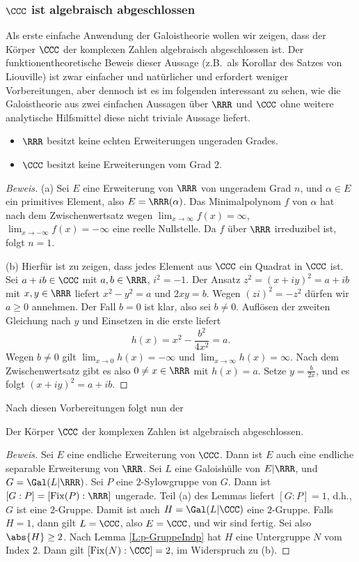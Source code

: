 \documentclass[12pt,a4paper,twoside]{article}
\DeclareMathOperator{\Fix}{Fix}
\begin{document}
\subsubsection{$\CCC$ ist algebraisch abgeschlossen}
Als erste einfache Anwendung der Galoistheorie wollen wir zeigen, dass der
K\"orper $\CCC$ der komplexen Zahlen algebraisch abgeschlossen ist. Der
funktionentheoretische Beweis dieser Aussage (z.B.\ als Korollar des Satzes
von Liouville) ist zwar einfacher und nat\"urlicher und erfordert weniger
Vorbereitungen, aber dennoch ist es im folgenden interessant zu sehen, wie die
Galoistheorie aus zwei einfachen Aussagen \"uber $\RRR$ und $\CCC$ ohne
weitere analytische Hilfsmittel diese nicht triviale Aussage liefert.
\begin{Lemma}\begin{itemize}
  \item[(a)] $\RRR$ besitzt keine echten Erweiterungen ungeraden Grades.
  \item[(b)] $\CCC$ besitzt keine Erweiterungen vom Grad $2$.
\end{itemize}
\end{Lemma}
\begin{proof}[Beweis]
  (a) Sei $E$ eine Erweiterung von $\RRR$ von ungeradem Grad $n$, und
  $\alpha\in E$ ein primitives Element, also $E=\RRR(\alpha)$. Das
  Minimalpolynom $f$ von $\alpha$ hat nach dem Zwischenwertsatz wegen
  $\lim_{x\to\infty}f(x)=\infty$, $\lim_{x\to-\infty}f(x)=-\infty$ eine reelle
  Nullstelle. Da $f$ \"uber $\RRR$ irreduzibel ist, folgt $n=1$.
  
  (b) Hierf\"ur ist zu zeigen, dass jedes Element aus $\CCC$ ein Quadrat in
  $\CCC$ ist. Sei $a+ib\in\CCC$ mit $a,b\in\RRR$, $i^2=-1$. Der Ansatz
  $z^2=(x+iy)^2=a+ib$ mit $x,y\in\RRR$ liefert $x^2-y^2=a$ und $2xy=b$. Wegen
  $(zi)^2=-z^2$ d\"urfen wir $a\ge0$ annehmen. Der Fall $b=0$ ist klar, also
  sei $b\ne0$. Aufl\"osen der zweiten Gleichung nach $y$ und Einsetzen in die
  erste liefert
\[
h(x)=x^2-\frac{b^2}{4x^2}=a.
\]
Wegen $b\ne0$ gilt $\lim_{x\to0}h(x)=-\infty$ und
$\lim_{x\to\infty}h(x)=\infty$. Nach dem Zwischenwertsatz gibt es also $0\ne
x\in\RRR$ mit $h(x)=a$. Setze $y=\frac{b}{2x}$, und es folgt $(x+iy)^2=a+ib$.
\end{proof}
Nach diesen Vorbereitungen folgt nun der
\begin{Satz}
  Der K\"orper $\CCC$ der komplexen Zahlen ist algebraisch abgeschlossen.
\end{Satz}
\begin{proof}[Beweis]
  Sei $E$ eine endliche Erweiterung von $\CCC$. Dann ist $E$ auch eine
  endliche separable Erweiterung von $\RRR$. Sei $L$ eine Galoish\"ulle von
  $E|\RRR$, und $G=\Gal(L|\RRR)$. Sei $P$ eine $2$-Sylowgruppe von $G$. Dann
  ist $[G:P]=[\Fix(P):\RRR]$ ungerade. Teil (a) des Lemmas liefert $[G:P]=1$,
  d.h., $G$ ist eine $2$-Gruppe. Damit ist auch $H=\Gal(L|\CCC)$ eine
  $2$-Gruppe. Falls $H=1$, dann gilt $L=\CCC$, also $E=\CCC$, und wir sind
  fertig. Sei also $\abs{H}\ge 2$. Nach Lemma \ref{L:p-GruppeIndp} hat $H$
  eine Untergruppe $N$ vom Index $2$. Dann gilt $[\Fix(N):\CCC]=2$, im
  Widerspruch zu (b).
\end{proof}
\end{document}
